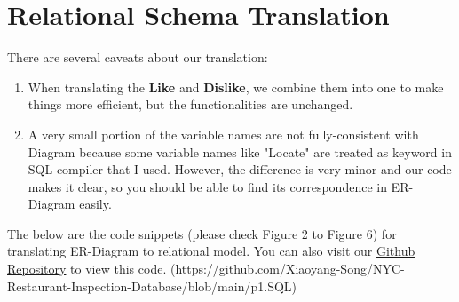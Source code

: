 \documentclass[a4paper,12pt]{article}
\theoremstyle{definition}
\begin{document}
\section{Relational Schema Translation}
There are several caveats about our translation:
\vspace{-0.4cm}
\begin{enumerate}
    \item When translating the \textbf{Like} and \textbf{Dislike}, we combine them into one to make things more efficient, but the functionalities are unchanged.
    \item A very small portion of the variable names are not fully-consistent with Diagram because some variable names like "Locate" are treated as keyword in SQL compiler that I used. However, the difference is very minor and our code makes it clear, so you should be able to find its correspondence in ER-Diagram easily.
\end{enumerate}
The below are the code snippets (please check Figure 2 to Figure 6) for translating ER-Diagram to relational model. You can also visit our \href{https://github.com/Xiaoyang-Song/NYC-Restaurant-Inspection-Database/blob/main/p1.SQL}{Github Repository} to view this code. (https://github.com/Xiaoyang-Song/NYC-Restaurant-Inspection-Database/blob/main/p1.SQL)
\end{document}
